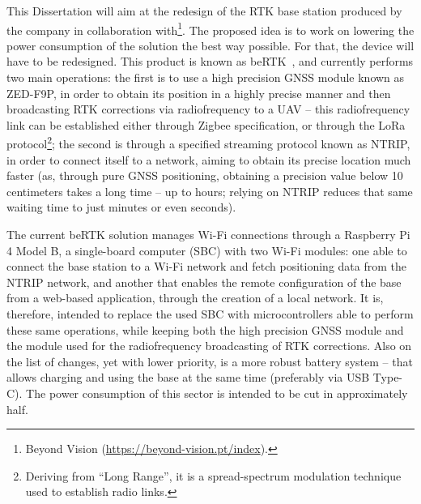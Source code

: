 This Dissertation will aim at the redesign of the RTK base station produced by the company in collaboration with\footnote{Beyond Vision (\url{https://beyond-vision.pt/index}).}. The proposed idea is to work on lowering the power consumption of the solution the best way possible. For that, the device will have to be redesigned. This product is known as beRTK\textsuperscript{\textregistered}~\cite{beRTK_2022}, and currently performs two main operations: the first is to use a high precision GNSS module known as ZED-F9P, in order to obtain its position in a highly precise manner and then broadcasting RTK corrections via radiofrequency to a UAV -- this radiofrequency link can be established either through Zigbee specification, or through the LoRa protocol\footnote{Deriving from ``Long Range'', it is a spread-spectrum modulation technique used to establish radio links.};
the second is through a specified streaming protocol known as \gls{NTRIP}, in order to connect itself to a network, aiming to obtain its precise location much faster (as, through pure GNSS positioning, obtaining a precision value below 10 centimeters takes a long time -- up to hours; relying on NTRIP reduces that same waiting time to just minutes or even seconds).

The current beRTK\textsuperscript{\textregistered} solution manages Wi-Fi connections through a Raspberry Pi 4 Model B, a single-board computer (SBC) with two Wi-Fi modules:
one able to connect the base station to a Wi-Fi network and fetch positioning data from the NTRIP network, and another that enables the remote configuration of the base from a web-based application, through the creation of a local network.
It is, therefore, intended to replace the used SBC with microcontrollers able to perform these same operations, while keeping both the high precision GNSS module and the module used for the radiofrequency broadcasting of RTK corrections.
Also on the list of changes, yet with lower priority, is a more robust battery system -- that allows charging and using the base at the same time (preferably via USB Type-C). The power consumption of this sector is intended to be cut in approximately half.
